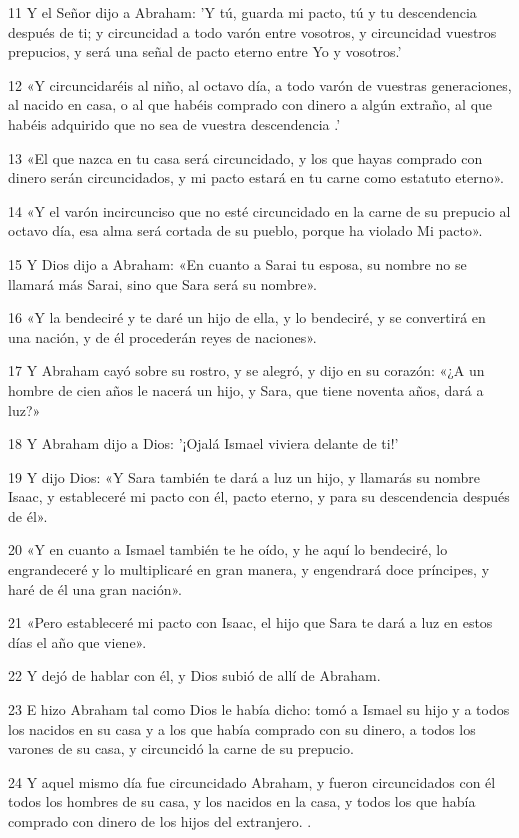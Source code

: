 \par 11 Y el Señor dijo a Abraham: 'Y tú, guarda mi pacto, tú y tu descendencia después de ti; y circuncidad a todo varón entre vosotros, y circuncidad vuestros prepucios, y será una señal de pacto eterno entre Yo y vosotros.'
\par 12 «Y circuncidaréis al niño, al octavo día, a todo varón de vuestras generaciones, al nacido en casa, o al que habéis comprado con dinero a algún extraño, al que habéis adquirido que no sea de vuestra descendencia .'
\par 13 «El que nazca en tu casa será circuncidado, y los que hayas comprado con dinero serán circuncidados, y mi pacto estará en tu carne como estatuto eterno».
\par 14 «Y el varón incircunciso que no esté circuncidado en la carne de su prepucio al octavo día, esa alma será cortada de su pueblo, porque ha violado Mi pacto».
\par 15 Y Dios dijo a Abraham: «En cuanto a Sarai tu esposa, su nombre no se llamará más Sarai, sino que Sara será su nombre».
\par 16 «Y la bendeciré y te daré un hijo de ella, y lo bendeciré, y se convertirá en una nación, y de él procederán reyes de naciones».
\par 17 Y Abraham cayó sobre su rostro, y se alegró, y dijo en su corazón: «¿A un hombre de cien años le nacerá un hijo, y Sara, que tiene noventa años, dará a luz?»
\par 18 Y Abraham dijo a Dios: '¡Ojalá Ismael viviera delante de ti!'
\par 19 Y dijo Dios: «Y Sara también te dará a luz un hijo, y llamarás su nombre Isaac, y estableceré mi pacto con él, pacto eterno, y para su descendencia después de él».
\par 20 «Y en cuanto a Ismael también te he oído, y he aquí lo bendeciré, lo engrandeceré y lo multiplicaré en gran manera, y engendrará doce príncipes, y haré de él una gran nación».
\par 21 «Pero estableceré mi pacto con Isaac, el hijo que Sara te dará a luz en estos días el año que viene».
\par 22 Y dejó de hablar con él, y Dios subió de allí de Abraham.
\par 23 E hizo Abraham tal como Dios le había dicho: tomó a Ismael su hijo y a todos los nacidos en su casa y a los que había comprado con su dinero, a todos los varones de su casa, y circuncidó la carne de su prepucio.
\par 24 Y aquel mismo día fue circuncidado Abraham, y fueron circuncidados con él todos los hombres de su casa, y los nacidos en la casa, y todos los que había comprado con dinero de los hijos del extranjero. .
